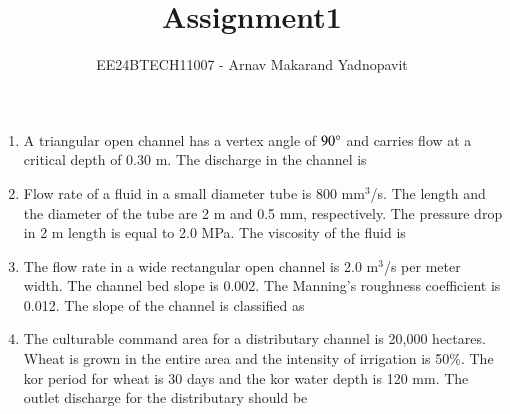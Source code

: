 \documentclass[journal,12pt,onecolumn]{IEEEtran}
\theoremstyle{remark}
\begin{document}
\title{Assignment1}
\author{EE24BTECH11007 - Arnav Makarand Yadnopavit}
\maketitle
\renewcommand{\thefigure}{\theenumi}
\renewcommand{\thetable}{\theenumi}
\begin{enumerate}
\item A triangular open channel has a vertex angle of $90\degree$ and carries flow at a critical depth of 0.30 m. The discharge in the channel is
\begin{enumerate}
\end{enumerate}
\item Flow rate of a fluid  in a small diameter tube is 800 mm$^3$/s. The length and the diameter of the tube are 2 m and 0.5 mm, respectively. The pressure drop in 2 m length is equal to 2.0 MPa. The viscosity of the fluid is 
\begin{enumerate}
\end{enumerate}
\item The flow rate in a wide rectangular open channel is 2.0 m$^3$/s per meter width. The channel bed slope is 0.002. The Manning's roughness coefficient is 0.012. The slope of the channel is classified as
\begin{enumerate}
\end{enumerate}
\item The culturable command area for a distributary channel is 20,000 hectares. Wheat is grown in the entire area and the intensity of irrigation is 50\%. The kor period for wheat is 30 days and the kor water depth is 120 mm. The outlet discharge for the distributary should be

\end{enumerate}
\end{document}

